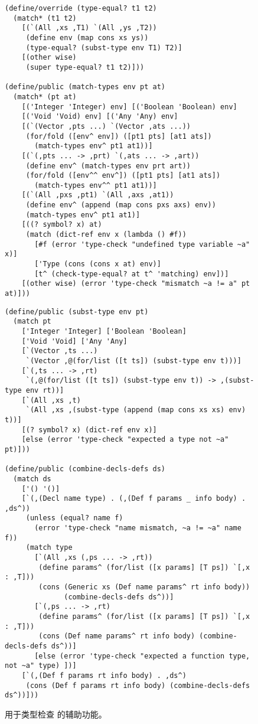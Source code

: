 \documentclass[11pt]{book}
\begin{document}
\begin{figure}[tbp]
\begin{lstlisting}
(define/override (type-equal? t1 t2)
  (match* (t1 t2)
    [(`(All ,xs ,T1) `(All ,ys ,T2))
     (define env (map cons xs ys))
     (type-equal? (subst-type env T1) T2)]
    [(other wise)
     (super type-equal? t1 t2)]))

(define/public (match-types env pt at)
  (match* (pt at)
    [('Integer 'Integer) env] [('Boolean 'Boolean) env]
    [('Void 'Void) env] [('Any 'Any) env]
    [(`(Vector ,pts ...) `(Vector ,ats ...))
     (for/fold ([env^ env]) ([pt1 pts] [at1 ats])
       (match-types env^ pt1 at1))]
    [(`(,pts ... -> ,prt) `(,ats ... -> ,art))
     (define env^ (match-types env prt art))
     (for/fold ([env^^ env^]) ([pt1 pts] [at1 ats])
       (match-types env^^ pt1 at1))]
    [(`(All ,pxs ,pt1) `(All ,axs ,at1))
     (define env^ (append (map cons pxs axs) env))
     (match-types env^ pt1 at1)]
    [((? symbol? x) at)
     (match (dict-ref env x (lambda () #f))
       [#f (error 'type-check "undefined type variable ~a" x)]
       ['Type (cons (cons x at) env)]
       [t^ (check-type-equal? at t^ 'matching) env])]
    [(other wise) (error 'type-check "mismatch ~a != a" pt at)]))
\end{lstlisting}
\end{figure}
\begin{figure}[tbp]
\begin{lstlisting}
(define/public (subst-type env pt)
  (match pt
    ['Integer 'Integer] ['Boolean 'Boolean]
    ['Void 'Void] ['Any 'Any]
    [`(Vector ,ts ...)
     `(Vector ,@(for/list ([t ts]) (subst-type env t)))]
    [`(,ts ... -> ,rt)
     `(,@(for/list ([t ts]) (subst-type env t)) -> ,(subst-type env rt))]
    [`(All ,xs ,t)
     `(All ,xs ,(subst-type (append (map cons xs xs) env) t))]
    [(? symbol? x) (dict-ref env x)]
    [else (error 'type-check "expected a type not ~a" pt)]))

(define/public (combine-decls-defs ds)
  (match ds
    ['() '()]
    [`(,(Decl name type) . (,(Def f params _ info body) . ,ds^))
     (unless (equal? name f)
       (error 'type-check "name mismatch, ~a != ~a" name f))
     (match type
       [`(All ,xs (,ps ... -> ,rt))
        (define params^ (for/list ([x params] [T ps]) `[,x : ,T]))
        (cons (Generic xs (Def name params^ rt info body))
              (combine-decls-defs ds^))]
       [`(,ps ... -> ,rt)
        (define params^ (for/list ([x params] [T ps]) `[,x : ,T]))
        (cons (Def name params^ rt info body) (combine-decls-defs ds^))]
       [else (error 'type-check "expected a function type, not ~a" type) ])]
    [`(,(Def f params rt info body) . ,ds^)
     (cons (Def f params rt info body) (combine-decls-defs ds^))]))
\end{lstlisting}
\caption{用于类型检查 \LangPoly{} 的辅助功能。}
\label{fig:type-check-Rvar0-aux}
\end{figure}
\end{document}
